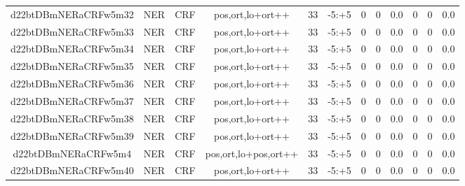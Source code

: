 \documentclass[a4paper]{article}
\begin{document}
\begin{landscape}
\begin{center}
\begin{tabular}{ |c|c|c|c|c|c|c|c|c|c|c|c|}
 
 	
 	\small{ d22btDBmNERaCRFw5m32 } & \small{ NER} & \small{  CRF }  & pos,ort,lo+ort++  &  33 &  \small{  -5:+5 }  &  0 & 0 & 0.0  &  0 & 0 & 0.0 \\
 	

 
 	
 	\small{ d22btDBmNERaCRFw5m33 } & \small{ NER} & \small{  CRF }  & pos,ort,lo+ort++  &  33 &  \small{  -5:+5 }  &  0 & 0 & 0.0  &  0 & 0 & 0.0 \\
 	

 
 	
 	\small{ d22btDBmNERaCRFw5m34 } & \small{ NER} & \small{  CRF }  & pos,ort,lo+ort++  &  33 &  \small{  -5:+5 }  &  0 & 0 & 0.0  &  0 & 0 & 0.0 \\
 	

 
 	
 	\small{ d22btDBmNERaCRFw5m35 } & \small{ NER} & \small{  CRF }  & pos,ort,lo+ort++  &  33 &  \small{  -5:+5 }  &  0 & 0 & 0.0  &  0 & 0 & 0.0 \\
 	

 
 	
 	\small{ d22btDBmNERaCRFw5m36 } & \small{ NER} & \small{  CRF }  & pos,ort,lo+ort++  &  33 &  \small{  -5:+5 }  &  0 & 0 & 0.0  &  0 & 0 & 0.0 \\
 	

 
 	
 	\small{ d22btDBmNERaCRFw5m37 } & \small{ NER} & \small{  CRF }  & pos,ort,lo+ort++  &  33 &  \small{  -5:+5 }  &  0 & 0 & 0.0  &  0 & 0 & 0.0 \\
 	

 
 	
 	\small{ d22btDBmNERaCRFw5m38 } & \small{ NER} & \small{  CRF }  & pos,ort,lo+ort++  &  33 &  \small{  -5:+5 }  &  0 & 0 & 0.0  &  0 & 0 & 0.0 \\
 	

 
 	
 	\small{ d22btDBmNERaCRFw5m39 } & \small{ NER} & \small{  CRF }  & pos,ort,lo+ort++  &  33 &  \small{  -5:+5 }  &  0 & 0 & 0.0  &  0 & 0 & 0.0 \\
 	

 
 	
 	\small{ d22btDBmNERaCRFw5m4 } & \small{ NER} & \small{  CRF }  & pos,ort,lo+pos,ort++  &  33 &  \small{  -5:+5 }  &  0 & 0 & 0.0  &  0 & 0 & 0.0 \\
 	

 
 	
 	\small{ d22btDBmNERaCRFw5m40 } & \small{ NER} & \small{  CRF }  & pos,ort,lo+ort++  &  33 &  \small{  -5:+5 }  &  0 & 0 & 0.0  &  0 & 0 & 0.0 \\
 	


\end{tabular}
\end{center}
\end{landscape}
\end{document}

